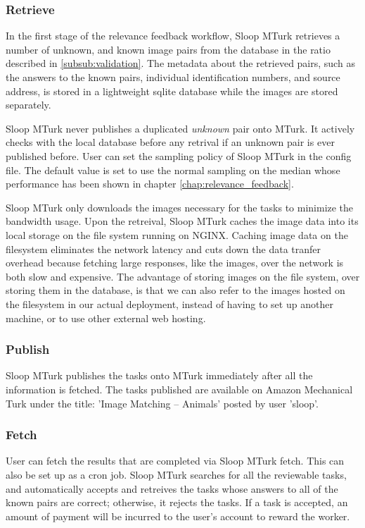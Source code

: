\subsubsection{Retrieve}
In the first stage of the relevance feedback workflow, Sloop MTurk retrieves a number of unknown, and known image pairs from the database in the ratio described in \ref{subsub:validation}. The metadata about the retrieved pairs, such as the answers to the known pairs, individual identification numbers, and source address, is stored in a lightweight sqlite database while the images are stored separately.

Sloop MTurk never publishes a duplicated \emph{unknown} pair onto MTurk. It actively checks with the local database before any retrival if an unknown pair is ever published before. User can set the sampling policy of Sloop MTurk in the config file. The default value is set to use the normal sampling on the median whose performance has been shown in chapter \ref{chap:relevance_feedback}.

Sloop MTurk only downloads the images necessary for the tasks to minimize the bandwidth usage. Upon the retreival, Sloop MTurk caches the image data into its local storage on the file system running on NGINX. Caching image data on the filesystem eliminates the network latency and cuts down the data tranfer overhead because fetching large responses, like the images, over the network is both slow and expensive. The advantage of storing images on the file system, over storing them in the database, is that we can also refer to the images hosted on the filesystem in our actual deployment, instead of having to set up another machine, or to use other external web hosting.

\subsubsection{Publish}
Sloop MTurk publishes the tasks onto MTurk immediately after all the information is fetched. The tasks published are available on Amazon Mechanical Turk under the title: 'Image Matching -- Animals' posted by user 'sloop'. %

\subsubsection{Fetch}
User can fetch the results that are completed via Sloop MTurk fetch. This can also be set up as a cron job. Sloop MTurk searches for all the reviewable tasks, and automatically accepts and retreives the tasks whose answers to all of the known pairs are correct; otherwise, it rejects the tasks. If a task is accepted, an amount of payment will be incurred to the user's account to reward the worker.

